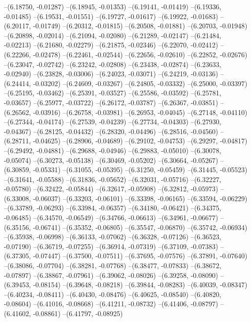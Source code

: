 --(6.18750, -0.01287)
--(6.18945, -0.01353)
--(6.19141, -0.01419)
--(6.19336, -0.01485)
--(6.19531, -0.01551)
--(6.19727, -0.01617)
--(6.19922, -0.01683)
--(6.20117, -0.01749)
--(6.20312, -0.01815)
--(6.20508, -0.01881)
--(6.20703, -0.01948)
--(6.20898, -0.02014)
--(6.21094, -0.02080)
--(6.21289, -0.02147)
--(6.21484, -0.02213)
--(6.21680, -0.02279)
--(6.21875, -0.02346)
--(6.22070, -0.02412)
--(6.22266, -0.02478)
--(6.22461, -0.02544)
--(6.22656, -0.02610)
--(6.22852, -0.02676)
--(6.23047, -0.02742)
--(6.23242, -0.02808)
--(6.23438, -0.02874)
--(6.23633, -0.02940)
--(6.23828, -0.03006)
--(6.24023, -0.03071)
--(6.24219, -0.03136)
--(6.24414, -0.03202)
--(6.24609, -0.03267)
--(6.24805, -0.03332)
--(6.25000, -0.03397)
--(6.25195, -0.03462)
--(6.25391, -0.03527)
--(6.25586, -0.03592)
--(6.25781, -0.03657)
--(6.25977, -0.03722)
--(6.26172, -0.03787)
--(6.26367, -0.03851)
--(6.26562, -0.03916)
--(6.26758, -0.03981)
--(6.26953, -0.04045)
--(6.27148, -0.04110)
--(6.27344, -0.04174)
--(6.27539, -0.04239)
--(6.27734, -0.04303)
--(6.27930, -0.04367)
--(6.28125, -0.04432)
--(6.28320, -0.04496)
--(6.28516, -0.04560)
--(6.28711, -0.04625)
--(6.28906, -0.04689)
--(6.29102, -0.04753)
--(6.29297, -0.04817)
--(6.29492, -0.04881)
--(6.29688, -0.04946)
--(6.29883, -0.05010)
--(6.30078, -0.05074)
--(6.30273, -0.05138)
--(6.30469, -0.05202)
--(6.30664, -0.05267)
--(6.30859, -0.05331)
--(6.31055, -0.05395)
--(6.31250, -0.05459)
--(6.31445, -0.05523)
--(6.31641, -0.05588)
--(6.31836, -0.05652)
--(6.32031, -0.05716)
--(6.32227, -0.05780)
--(6.32422, -0.05844)
--(6.32617, -0.05908)
--(6.32812, -0.05973)
--(6.33008, -0.06037)
--(6.33203, -0.06101)
--(6.33398, -0.06165)
--(6.33594, -0.06229)
--(6.33789, -0.06293)
--(6.33984, -0.06357)
--(6.34180, -0.06421)
--(6.34375, -0.06485)
--(6.34570, -0.06549)
--(6.34766, -0.06613)
--(6.34961, -0.06677)
--(6.35156, -0.06741)
--(6.35352, -0.06805)
--(6.35547, -0.06870)
--(6.35742, -0.06934)
--(6.35938, -0.06998)
--(6.36133, -0.07062)
--(6.36328, -0.07126)
--(6.36523, -0.07190)
--(6.36719, -0.07255)
--(6.36914, -0.07319)
--(6.37109, -0.07383)
--(6.37305, -0.07447)
--(6.37500, -0.07511)
--(6.37695, -0.07576)
--(6.37891, -0.07640)
--(6.38086, -0.07704)
--(6.38281, -0.07768)
--(6.38477, -0.07833)
--(6.38672, -0.07897)
--(6.38867, -0.07961)
--(6.39062, -0.08026)
--(6.39258, -0.08090)
--(6.39453, -0.08154)
--(6.39648, -0.08218)
--(6.39844, -0.08283)
--(6.40039, -0.08347)
--(6.40234, -0.08411)
--(6.40430, -0.08476)
--(6.40625, -0.08540)
--(6.40820, -0.08604)
--(6.41016, -0.08668)
--(6.41211, -0.08732)
--(6.41406, -0.08797)
--(6.41602, -0.08861)
--(6.41797, -0.08925)

